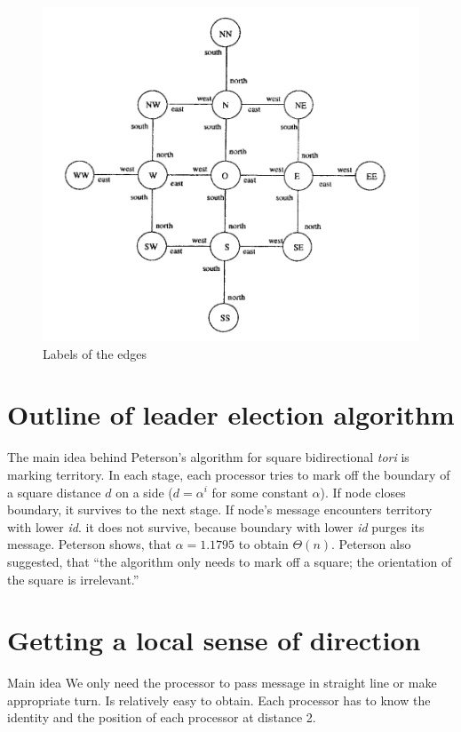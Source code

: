 \documentclass{article}
\begin{document}
\begin{figure}[h!]
\centering
\includegraphics[scale=0.9]{labels.png}
\caption{Labels of the edges \cite{mans}}
\label{fig:torus}
\end{figure}

\newpage

\section{Outline of leader election algorithm}  
The main idea behind Peterson’s algorithm for square bidirectional \textit{tori} is marking territory. In each stage, each processor tries to mark off the boundary of a square distance $d$ on a side ($d=\alpha^i$ for some constant $\alpha$). If node closes boundary, it survives to the next stage. If node's message encounters territory with lower \textit{id}. it does not survive, because boundary with lower \textit{id} purges its message. Peterson shows, that $\alpha=1.1795$ to obtain $\Theta(n)$. Peterson also suggested, that “the algorithm only
needs to mark off a square; the orientation of the square
is irrelevant.”\cite{peterson}

\section{Getting a local sense of direction}

\begin{subsection}{Main idea}
We only need the processor to pass message in straight line or make appropriate turn. Is relatively easy to obtain. Each processor has to know the identity and the position of each processor at distance 2.   
\end{subsection}
\end{document}
